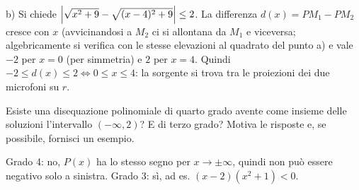 \documentclass[10pt]{article}
\begin{document}
{\begin{solution}
b) Si chiede $\left\vert \sqrt{x^2 + 9} - \sqrt{(x-4)^2 + 9} \right\vert \leq 2$. La differenza $d(x) = PM_1 - PM_2$ cresce
con $x$ (avvicinandosi a $M_2$ ci si allontana da $M_1$ e viceversa; algebricamente si verifica con le
stesse elevazioni al quadrato del punto a) e vale $-2$ per $x = 0$ (per simmetria) e $2$ per $x = 4$.
Quindi $-2 \leq d(x) \leq 2 \iff 0 \leq x \leq 4$: la sorgente si trova tra le proiezioni dei due
microfoni su $r$.
\end{solution}

\bonusexercise Esiste una disequazione polinomiale di quarto grado avente come insieme delle soluzioni l'intervallo $(-\infty, 2)$? E di terzo grado? Motiva le risposte e, se possibile, fornisci un esempio.
\bonusexercisescore[1]
\vspace{-.2em}
\bonusexercisenote

\begin{solution}
Grado 4: no, $P(x)$ ha lo stesso segno per $x \to \pm\infty$, quindi non può essere negativo
solo a sinistra. Grado 3: sì, ad es. $(x-2)(x^2+1) < 0$.
\end{solution}

\vfill
\answergrid
\finalscore
\newpage}

\ifdefined\versioneDSA
{}\verifica
\else
{}\verifica
{}\verifica
{}\verifica
{}\verifica
{}\verifica
{}\verifica
{}\verifica
\fi
\end{document}

